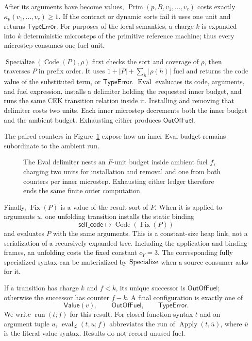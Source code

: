After its arguments have become values,
\(\operatorname{Prim}(p,B,v_1,\ldots,v_r)\) costs exactly
\(\kappa_p(v_1,\ldots,v_r)\geq1\).  If the contract or dynamic sorts fail it
uses one unit and returns \(\mathsf{TypeError}\).  For purposes of the local
semantics, a charge \(k\) is expanded into \(k\) deterministic microsteps of
the primitive reference machine; thus every microstep consumes one fuel unit.

\(\operatorname{Specialize}(\operatorname{Code}(P),\rho)\) first checks the
sort and coverage of \(\rho\), then traverses \(P\) in prefix order.  It uses
\(1+|P|+\sum_h|\rho(h)|\) fuel and returns the code value of the substituted
term, or \(\mathsf{TypeError}\).  \(\operatorname{Eval}\) evaluates its code,
arguments, and fuel expression, installs a delimiter holding the requested
inner budget, and runs the same CEK transition relation inside it.  Installing
and removing that delimiter costs two units.  Each inner microstep decrements
both the inner budget and the ambient budget.  Exhausting either produces
\(\mathsf{OutOfFuel}\).

The paired counters in Figure~\ref{fig:eval-delimiter} expose how an inner Eval
budget remains subordinate to the ambient run.
\begin{figure}[H]
\centering

\caption{The Eval delimiter nests an \(F\)-unit budget inside ambient fuel \(f\), charging two units for installation and removal and one from both counters per inner microstep.  Exhausting either ledger therefore ends the same finite outer computation.}
\label{fig:eval-delimiter}
\end{figure}

Finally, \(\operatorname{Fix}(P)\) is a value of the result sort of \(P\).
When it is applied to arguments \(u\), one unfolding transition installs the
static binding
\[
 \mathsf{self\_code}\longmapsto
 \operatorname{Code}(\operatorname{Fix}(P))
\]
and evaluates \(P\) with the same arguments.  This is a constant-size heap
link, not a serialization of a recursively expanded tree.  Including the
application and binding frames, an unfolding costs the fixed constant
\(c_Y=3\).  The corresponding fully specialized syntax can be materialized by
\(\operatorname{Specialize}\) when a source consumer asks for it.

If a transition has charge \(k\) and \(f<k\), its unique successor is
\(\mathsf{OutOfFuel}\); otherwise the successor has counter \(f-k\).  A final
configuration is exactly one of
\[
 \mathsf{Value}(v),\qquad \mathsf{OutOfFuel},\qquad
 \mathsf{TypeError}.
\]
We write \(\operatorname{run}(t;f)\) for this result.  For closed function
syntax \(t\) and an argument tuple \(u\),
\(\operatorname{eval}_{\mathcal L}(t,u;f)\) abbreviates the run of
\(\operatorname{Apply}(t,\overline u)\), where \(\overline u\) is the literal
value syntax.  Results do not record unused fuel.

